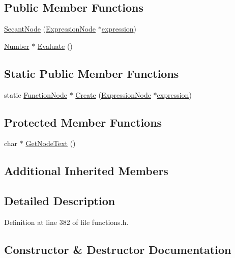 \subsection*{Public Member Functions}
\begin{DoxyCompactItemize}
\item 
\hyperlink{classSecantNode_a78f1fa342c03aa179720103c514d0ee7}{Secant\+Node} (\hyperlink{classExpressionNode}{Expression\+Node} $\ast$\hyperlink{classFunctionNode_ad7577b179a1937aaf8a0058bb5b546dc}{expression})
\item 
\hyperlink{structNumber}{Number} $\ast$ \hyperlink{classSecantNode_a114c4b9606adcf184123e7d4a6a95056}{Evaluate} ()
\end{DoxyCompactItemize}
\subsection*{Static Public Member Functions}
\begin{DoxyCompactItemize}
\item 
static \hyperlink{classFunctionNode}{Function\+Node} $\ast$ \hyperlink{classSecantNode_a8878d4c01c876fe1b9741cced07ef86b}{Create} (\hyperlink{classExpressionNode}{Expression\+Node} $\ast$\hyperlink{classFunctionNode_ad7577b179a1937aaf8a0058bb5b546dc}{expression})
\end{DoxyCompactItemize}
\subsection*{Protected Member Functions}
\begin{DoxyCompactItemize}
\item 
char $\ast$ \hyperlink{classSecantNode_a7d33d09f02a8b56d10c73366be1c792d}{Get\+Node\+Text} ()
\end{DoxyCompactItemize}
\subsection*{Additional Inherited Members}


\subsection{Detailed Description}


Definition at line 382 of file functions.\+h.



\subsection{Constructor \& Destructor Documentation}
